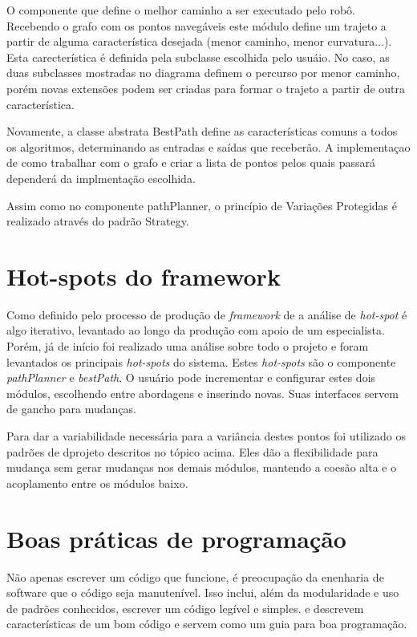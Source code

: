 O componente que define o melhor caminho a ser executado pelo robô. Recebendo o grafo com os pontos navegáveis este módulo define um trajeto a partir de alguma característica desejada (menor caminho, menor curvatura...). Esta carecterística é definida pela subclasse escolhida pelo usuáio. No caso, as duas subclasses mostradas no diagrama definem o percurso por menor caminho, porém novas extensões podem ser criadas para formar o trajeto a partir de outra característica.

Novamente, a classe abstrata BestPath define as características comuns a todos os algoritmos, determinando as entradas e saídas que receberão. A implementaçao de como trabalhar com o grafo e criar a lista de pontos pelos quais passará dependerá da implmentação escolhida.

Assim como no componente pathPlanner, o princípio de Variações Protegidas é realizado através do padrão Strategy.

\section{Hot-spots do framework}

Como definido pelo processo de produção de \textit{framework} de \cite{Fayad1999} a análise de \textit{hot-spot} é algo iterativo, levantado ao longo da produção com apoio de um especialista. Porém, já de início foi realizado uma análise sobre todo o projeto e foram levantados os principais \textit{hot-spots} do sistema. Estes \textit{hot-spots} são o componente \textit{pathPlanner} e \textit{bestPath}. O usuário pode incrementar e configurar estes dois módulos, escolhendo entre abordagens e inserindo novas. Suas interfaces servem de gancho para mudanças.

Para dar a variabilidade necessária para a variância destes pontos foi utilizado os padrões de dprojeto descritos no tópico acima. Eles dão a flexibilidade para mudança sem gerar mudanças nos demais módulos, mantendo a coesão alta e o acoplamento entre os módulos baixo.

\section{Boas práticas de programação}

Não apenas escrever um código que funcione, é preocupação da enenharia de software que o código seja manutenível. Isso inclui, além da modularidade e uso de padrões conhecidos, escrever um código legível e simples. \cite{Goodliffe2007} e \cite{McConnel2004} descrevem características de um bom código e servem como um guia para boa programação.

